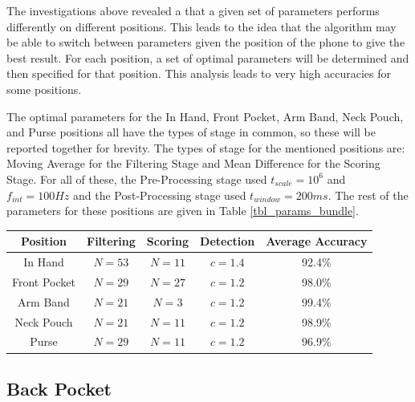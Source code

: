             The investigations above revealed a that a given set of parameters performs differently on different positions. This leads to the idea that the algorithm may be able to switch between parameters given the position of the phone to give the best result. For each position, a set of optimal parameters will be determined and then specified for that position. This analysis leads to very high accuracies for some positions.

            The optimal parameters for the In Hand, Front Pocket, Arm Band, Neck Pouch, and Purse positions all have the types of stage in common, so these will be reported together for brevity. The types of stage for the mentioned positions are: Moving Average for the Filtering Stage and Mean Difference for the Scoring Stage. For all of these, the Pre-Processing stage used $t_{scale} = 10^6$ and $f_{int} = 100Hz$ and the Post-Processing stage used $t_{window} = 200ms$. The rest of the parameters for these positions are given in Table \ref{tbl_params_bundle}.

            \begin{center}
                \label{tbl_params_bundle}
                \begin{tabular}{|c|c|c|c||c|}
                    \hline
                    Position & Filtering & Scoring & Detection & Average Accuracy \\
                    \hline
                    In Hand & $N=53$ & $N=11$ & $c=1.4$ & 92.4\% \\
                    Front Pocket & $N=29$ & $N=27$ & $c=1.2$ & 98.0\% \\
                    Arm Band & $N=21$ & $N=3$ & $c=1.2$ & 99.4\% \\
                    Neck Pouch & $N=21$ & $N=11$ & $c=1.2$ & 98.9\% \\
                    Purse & $N=29$ & $N=11$ & $c=1.2$ & 96.9\% \\
                    \hline
                \end{tabular}
            \end{center}  

            \subsection{Back Pocket}

